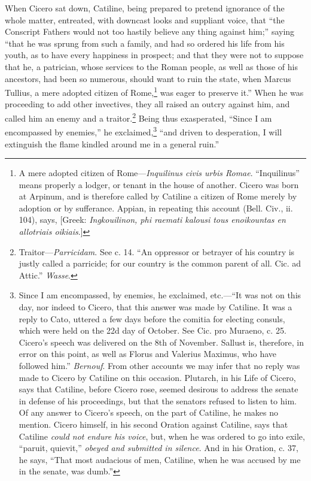When Cicero sat down, Catiline, being prepared to pretend ignorance of
the whole matter, entreated, with downcast looks and suppliant voice,
that ``the Conscript Fathers would not too hastily believe any thing
against him;'' saying ``that he was sprung from such a family, and had
so ordered his life from his youth, as to have every happiness in
prospect; and that they were not to suppose that he, a patrician,
whose services to the Roman people, as well as those of his ancestors,
had been so numerous, should want to ruin the state, when Marcus
Tullius, a mere adopted citizen of Rome,\footnote{A mere adopted citizen of Rome—\emph{Inquilinus civis urbis Romae}.
``Inquilinus'' means properly a lodger, or tenant in the house of another.
Cicero was born at Arpinum, and is therefore called by Catiline a
citizen of Rome merely by adoption or by sufferance. Appian, in
repeating this account (Bell. Civ., ii. 104), says, [Greek:
\emph{Ingkouilinon, phi raemati kalousi tous enoikountas en allotriais
oikiais}.]} was eager to preserve
it.'' When he was proceeding to add other invectives, they all raised
an outcry against him, and called him an enemy and a traitor.\footnote{Traitor—\emph{Parricidam}. See c. 14. ``An oppressor or betrayer
of his country is justly called a parricide; for our country is the
common parent of all. Cic. ad Attic.'' \emph{Wasse}.}
Being thus exasperated, ``Since I am encompassed by enemies,'' he
exclaimed,\footnote{Since I am encompassed, by enemies, he exclaimed, etc.—``It
was not on this day, nor indeed to Cicero, that this answer was made
by Catiline. It was a reply to Cato, uttered a few days before the
comitia for electing consuls, which were held on the 22d day of
October. See Cic. pro Muraeno, c. 25. Cicero's speech was delivered on
the 8th of November. Sallust is, therefore, in error on this point, as
well as Florus and Valerius Maximus, who have followed him.''
\emph{Bernouf}. From other accounts we may infer that no reply was made to
Cicero by Catiline on this occasion. Plutarch, in his Life of Cicero,
says that Catiline, before Cicero rose, seemed desirous to address the
senate in defense of his proceedings, but that the senators refused to
listen to him. Of any answer to Cicero's speech, on the part of
Catiline, he makes no mention. Cicero himself, in his second Oration
against Catiline, says that Catiline \emph{could not endure his voice},
but, when he was ordered to go into exile, ``paruit, quievit,'' \emph{obeyed
and submitted in silence}. And in his Oration, c. 37, he says, ``That
most audacious of men, Catiline, when he was accused by me in the
senate, was dumb.''} ``and driven to desperation, I will extinguish the
flame kindled around me in a general ruin.''

